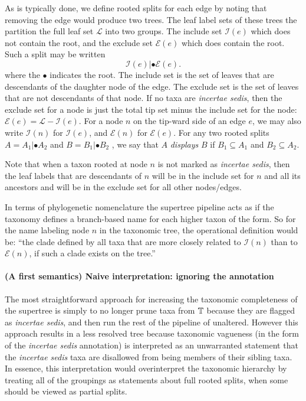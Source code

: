 \documentclass[english]{article}
\begin{document}
As is typically done, we define rooted splits for each edge by noting that
removing the edge would produce two trees. The leaf label sets of these trees
the partition the full leaf set $\mathcal{L}$ into two groups. The include set $\mathcal{I}(e)$ which
does not contain the root, and the exclude set $\mathcal{E}(e)$ which does contain the root.
Such a split may be written
\[ \mathcal{I}(e)|\bullet\mathcal{E}(e).\]
where the $\bullet$ indicates the root. The include set is the set of leaves that are
descendants of the daughter node of the edge. The exclude set is the set of
leaves that are not descendants of that node. If no taxa are \emph{incertae sedis},
then the exclude set for a node is just the total tip set minus the include set
for the node: $\mathcal{E}(e)  =\mathcal{L}-\mathcal{I}(e)$. For a node $n$ on the tip-ward side of an edge $e$, we
may also write $\mathcal{I}(n)$ for $\mathcal{I}(e)$, and $\mathcal{E}(n)$ for $\mathcal{E}(e)$. For any two rooted splits $A=A_{1}|\bullet A_{2}$
and $B=B_{1}|\bullet B_{2}$ , we say that $A$ \emph{displays }$B$ if $B_{1}\subseteq A_{1}$ and $B_{2}\subseteq A_{2}$.

Note that when a taxon rooted at node $n$ is not marked as \emph{incertae sedis},
then the leaf labels that are descendants of $n$ will be in the include set for
$n$ and all its ancestors and will be in the exclude set for all other nodes/edges.

In terms of phylogenetic nomenclature the supertree pipeline acts as if the
taxonomy defines a branch-based name \citep[see][]{deQueiroz2013} for each
higher taxon of the form. So for the name labeling node $n$ in the taxonomic
tree, the operational definition would be: ``the clade defined by all taxa that
are more closely related to $\mathcal{I}(n)$ than to $\mathcal{E}(n)$, if such a clade exists on the tree.''


\paragraph{(A first semantics) Naive interpretation: ignoring the annotation}

The most straightforward approach for increasing the taxonomic
completeness of the supertree is simply to no longer prune taxa from
$\mbox{\ensuremath{\mathbb{T}}}$ because they are flagged as \emph{incertae sedis}, and
then run the rest of the pipeline of \citet{redelings2017supertree}
unaltered.
However this approach results in a less resolved tree
because taxonomic vagueness (in the form of the \emph{incertae sedis}
annotation) is interpreted as an unwarranted statement that the
\emph{incertae sedis} taxa are disallowed from being members of their
sibling taxa.
In essence, this interpretation would overinterpret the taxonomic
    hierarchy by treating all of the groupings as statements about
    full rooted splits, when some should be viewed as partial splits.
\end{document}
